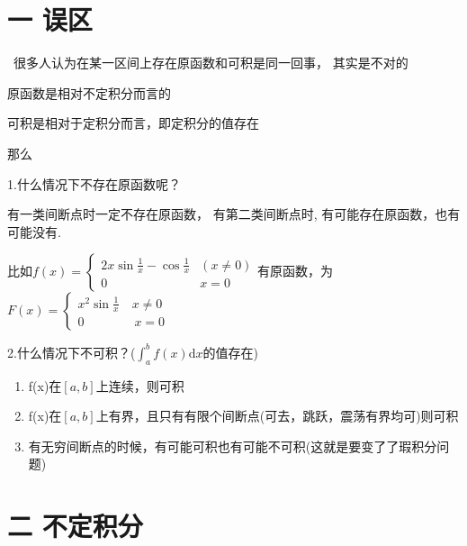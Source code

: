 \documentclass[a4paper,11pt]{book}
\begin{document}
\section*{一 \quad 误区}

\quad \ 很多人认为在某一区间上存在原函数和可积是同一回事，
其实是不对的

原函数是相对不定积分而言的

可积是相对于定积分而言，即定积分的值存在

\noindent 那么

1.什么情况下不存在原函数呢？

有一类间断点时一定不存在原函数，
    有第二类间断点时,
有可能存在原函数，也有可能没有.


比如$\displaystyle{f(x)=\left\{\begin{array}{ll}
    2 x \sin \frac{1}{x}-\cos \frac{1}{x} & (x \neq 0) \\
    0 & x=0
    \end{array}\right.}$有原函数，为
$\displaystyle{F(x)=\left\{\begin{array}{l}
        x^{2} \sin \frac{1}{x}  \quad x \neq 0 \\
        0 \qquad \qquad x=0
        \end{array}\right.}$

2.什么情况下不可积？($\int _{a}^{b}f(x)\mathrm{d}x$的值存在)
\begin{enumerate}
    \item f(x)在$[a,b]$上连续，则可积
    
    \item f(x)在$[a,b]$上有界，且只有有限个间断点(可去，跳跃，震荡有界均可)则可积
    
    \item 有无穷间断点的时候，有可能可积也有可能不可积(这就是要变了了瑕积分问题)
    
\end{enumerate}



\section*{二 \quad 不定积分}
\end{document}
